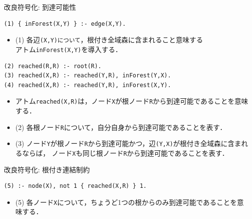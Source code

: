 \documentclass[dvipdfmx,11pt]{beamer}
\newcommand{\code}[1]{\lstinline[basicstyle=\ttfamily]{#1}}
\begin{document}
\begin{frame}[fragile]{改良符号化: 到達可能性}
\begin{exampleblock}{}\small
\begin{lstlisting}
(1) { inForest(X,Y) } :- edge(X,Y).
\end{lstlisting}
\end{exampleblock}
\begin{itemize}
 \item (1) 各辺\code{(X,Y)について}，根付き全域森に含まれること意味する \\
	  アトム\code{inForest(X,Y)}を導入する．
\end{itemize}
\begin{exampleblock}{}\small
\begin{lstlisting}
(2) reached(R,R) :- root(R).
(3) reached(X,R) :- reached(Y,R), inForest(Y,X).
(4) reached(X,R) :- reached(Y,R), inForest(X,Y).
\end{lstlisting}
\end{exampleblock}
\vfill
\begin{itemize}
\item アトム\code{reached(X,R)}は，ノード\code{X}が根ノード\code{R}から到達可能であることを意味する．
\item (2) 各根ノード\code{R}について，自分自身から到達可能であることを表す．
\item (3) ノード\code{Y}が根ノード\code{R}から到達可能かつ，辺\code{(Y,X)}が根付き全域森に含まれるならば，
	  ノード\code{X}も同じ根ノード\code{R}から到達可能であることを表す．
\end{itemize}
\end{frame}
\begin{frame}[fragile]{改良符号化: 根付き連結制約}
\begin{exampleblock}{}\small
\begin{lstlisting}
(5) :- node(X), not 1 { reached(X,R) } 1.
\end{lstlisting}
\end{exampleblock}
\vfill
\begin{itemize}
\item (5) 各ノード\code{X}について，ちょうど1つの根からのみ到達可能であることを意味する．
\end{itemize}
\end{frame}
\end{document}
